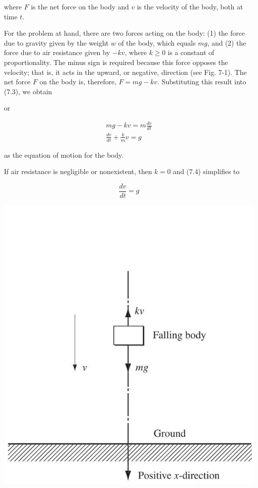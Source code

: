 \documentclass[10pt]{article}
\begin{document}
where $F$ is the net force on the body and $v$ is the velocity of the body, both at time $t$.

For the problem at hand, there are two forces acting on the body: (1) the force due to gravity given by the weight $w$ of the body, which equals $m g$, and (2) the force due to air resistance given by $-k v$, where $k \geq 0$ is a constant of proportionality. The minus sign is required because this force opposes the velocity; that is, it acts in the upward, or negative, direction (see Fig. 7-1). The net force $F$ on the body is, therefore, $F=m g-k v$. Substituting this result into (7.3), we obtain

or


\begin{gather*}
m g-k v=m \frac{d v}{d t} \\
\frac{d v}{d t}+\frac{k}{m} v=g \tag{7.4}
\end{gather*}


as the equation of motion for the body.

If air resistance is negligible or nonexistent, then $k=0$ and (7.4) simplifies to


\begin{equation*}
\frac{d v}{d t}=g \tag{7.5}
\end{equation*}


\begin{center}
\includegraphics[max width=\textwidth]{2024_04_03_5bb5b4275a64cb9887d1g-069(1)}
\end{center}
\end{document}
